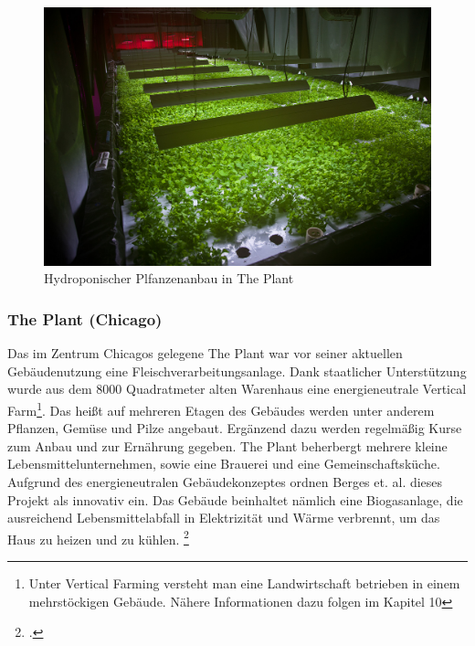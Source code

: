 \documentclass{scrartcl}
\begin{document}
\begin{figure}[htbp]
    \centering
    \includegraphics[width=14cm]{image_folder/the_plant_2.jpg}
    \caption{Hydroponischer Plfanzenanbau in The Plant}
\end{figure} 

\subsubsection*{The Plant (Chicago)}
Das im Zentrum Chicagos gelegene The Plant war vor seiner aktuellen Gebäudenutzung eine Fleischverarbeitungsanlage. Dank staatlicher Unterstützung wurde aus dem 8000 Quadratmeter alten Warenhaus eine energieneutrale Vertical Farm\footnote{Unter Vertical Farming versteht man eine Landwirtschaft betrieben in einem mehrstöckigen Gebäude. Nähere Informationen dazu folgen im Kapitel 10}. Das heißt auf mehreren Etagen des Gebäudes werden unter anderem Pflanzen, Gemüse und Pilze angebaut. Ergänzend dazu werden regelmäßig Kurse zum Anbau und zur Ernährung gegeben. The Plant beherbergt mehrere kleine Lebensmittelunternehmen, sowie eine Brauerei und eine Gemeinschaftsküche. Aufgrund des energieneutralen Gebäudekonzeptes ordnen Berges et. al. dieses Projekt als innovativ ein. Das Gebäude beinhaltet nämlich eine Biogasanlage, die ausreichend Lebensmittelabfall in Elektrizität und Wärme verbrennt, um das Haus zu heizen und zu kühlen.  \footcites[Vgl.][S.18]{Al-Kodmany2018TheCity} 
\end{document}
